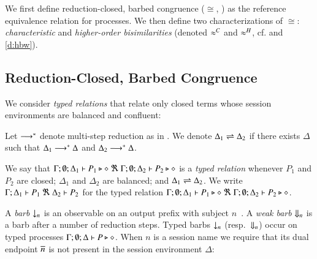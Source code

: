 \noi We first define reduction-closed, barbed congruence ($\cong$, ) as the
reference equivalence relation for \HOp processes.
We then define two characterizations of $\cong$:
\emph{characteristic} and
\emph{higher-order bisimilarities}   
 (denoted $\approx^C$ and $\approx^H$, cf.  and \ref{d:hbw}). 

\subsection{Reduction-Closed, Barbed Congruence}
\label{subsec:rc}

We consider \emph{typed relations} that relate only closed terms whose
session environments %
are balanced  and confluent:

\begin{definition}
Let $\longrightarrow^\ast$ denote multi-step reduction as in .
	We denote $\Delta_1 \rightleftharpoons \Delta_2$ if there exists $\Delta$ such that
	$\Delta_1 \longrightarrow^\ast \Delta$ and $\Delta_2 \longrightarrow^\ast \Delta$.
\end{definition}



\begin{definition}
	We say that
	$\Gamma; \emptyset; \Delta_1 \vdash P_1 \triangleright \diamond\ \Re \ \Gamma; \emptyset; \Delta_2 \vdash P_2 \triangleright \diamond$
	is a {\em typed relation} whenever
	$P_1$ and $P_2$ are closed;
	$\Delta_1$ and $\Delta_2$ are balanced; and 
	$\Delta_1 \rightleftharpoons \Delta_2$.
	We write $\horel{\Gamma}{\Delta_1}{P_1}{\ \Re \ }{\Delta_2}{P_2}$
	for the typed relation $\Gamma; \emptyset; \Delta_1 \vdash P_1 \triangleright \diamond\ \Re \ \Gamma; \emptyset; \Delta_2 \vdash P_2 \triangleright \diamond$.
\end{definition}



A \emph{barb} $\downarrow_{n}$ is an observable on an output prefix with subject $n$~\cite{MiSa92}.
A \emph{weak barb} $\Downarrow_{n}$ is a barb after a number of reduction steps.
Typed barbs $\downarrow_{n}$ (resp.\ $\Downarrow_{n}$)
occur on typed processes $\Gamma; \emptyset; \Delta \vdash P \triangleright \diamond$.
When $n$ is a session name we require that its dual endpoint $\overline{n}$ is not present
in the session environment $\Delta$:

